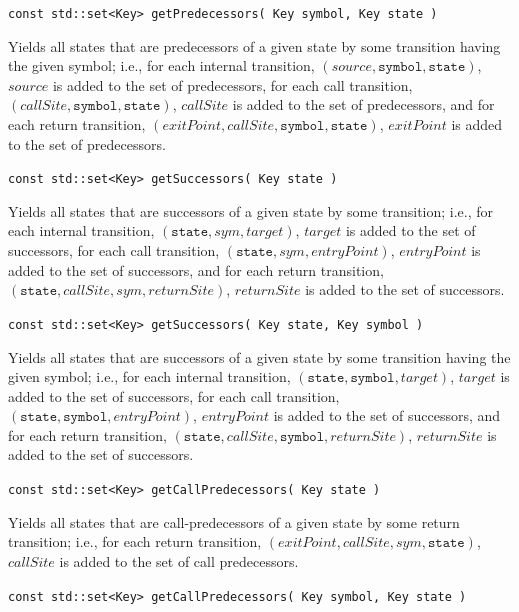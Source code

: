 \documentclass{llncs}
\begin{document}
\begin{description}
  \item\texttt{const std::set<Key> getPredecessors( Key symbol, Key state )} \nopagebreak

    Yields all states that are predecessors of a given state by some transition having the given symbol; i.e., for each internal transition, $(source,\texttt{symbol},\texttt{state})$, $source$ is added to the set of predecessors, for each call transition, $(callSite,\texttt{symbol},\texttt{state})$, $callSite$ is added to the set of predecessors, and for each return transition, $(exitPoint,callSite,\texttt{symbol},\texttt{state})$, $exitPoint$ is added to the set of predecessors.

  \item\texttt{const std::set<Key> getSuccessors( Key state )} \nopagebreak

    Yields all states that are successors of a given state by some transition; i.e., for each internal transition, $(\texttt{state},sym,target)$, $target$ is added to the set of successors, for each call transition, $(\texttt{state},sym,entryPoint)$, $entryPoint$ is added to the set of successors, and for each return transition, $(\texttt{state},callSite,sym,returnSite)$, $returnSite$ is added to the set of successors.

  \item\texttt{const std::set<Key> getSuccessors( Key state, Key symbol )} \nopagebreak

    Yields all states that are successors of a given state by some transition having the given symbol; i.e., for each internal transition, $(\texttt{state},\texttt{symbol},target)$, $target$ is added to the set of successors, for each call transition, $(\texttt{state},\texttt{symbol},entryPoint)$, $entryPoint$ is added to the set of successors, and for each return transition, $(\texttt{state},callSite,\texttt{symbol},returnSite)$, $returnSite$ is added to the set of successors.

  \item\texttt{const std::set<Key> getCallPredecessors( Key state )} \nopagebreak

    Yields all states that are call-predecessors of a given state by some return transition; i.e., for each return transition, $(exitPoint,callSite,sym,\texttt{state})$, $callSite$ is added to the set of call predecessors.

  \item\texttt{const std::set<Key> getCallPredecessors( Key symbol, Key state )} \nopagebreak


\end{description}
\end{document}
